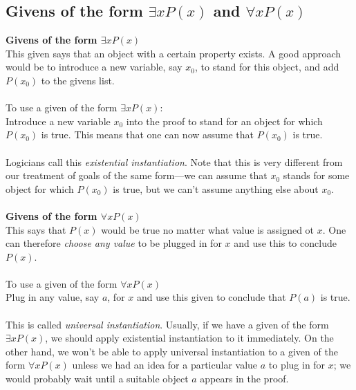 \documentclass{report}
\theoremstyle{definition}
\begin{document}
\subsection{Givens of the form $\exists xP(x)$ and $\forall xP(x)$}
\textbf{Givens of the form $\exists xP(x)$}\\
This given says that an object with a certain property exists. A good approach would be to introduce a new variable, say 
$x_0$, to stand for this object, and add $P(x_0)$ to the givens list.\\
\vspace{1mm}\\
\indent To use a given of the form $\exists xP(x)$:\\
\indent Introduce a new variable $x_0$ into the proof to stand for an object for which $P(x_0)$ is true. This means
that one can now assume that $P(x_0)$ is true.\\
\vspace{1mm}\\
Logicians call this \textit{existential instantiation}. Note that this is very different from our treatment of goals of the 
same form---we can assume that $x_0$ stands for some object for which $P(x_0)$ is true, but we can't assume anything else 
about $x_0$.\\
\vspace{1mm}\\
\textbf{Givens of the form $\forall xP(x)$}\\
This says that $P(x)$ would be true no matter what value is assigned ot $x$. One can therefore \textit{choose any value} to be
plugged in for $x$ and use this to conclude $P(x)$.\\
\vspace{1mm}\\
\indent To use a given of the form $\forall xP(x)$\\
\indent Plug in any value, say $a$, for $x$ and use this given to conclude that $P(a)$ is true.\\
\vspace{1mm}\\
This is called \textit{universal instantiation}. Usually, if we have a given of the form $\exists xP(x)$, we should apply
existential instantiation to it immediately. On the other hand,
we won't be able to apply universal instantiation to a given of the form $\forall xP(x)$ unless we had an idea for
a particular value $a$ to plug in for $x$; we would probably wait until a suitable object $a$ appears in the proof.\\
\end{document}
